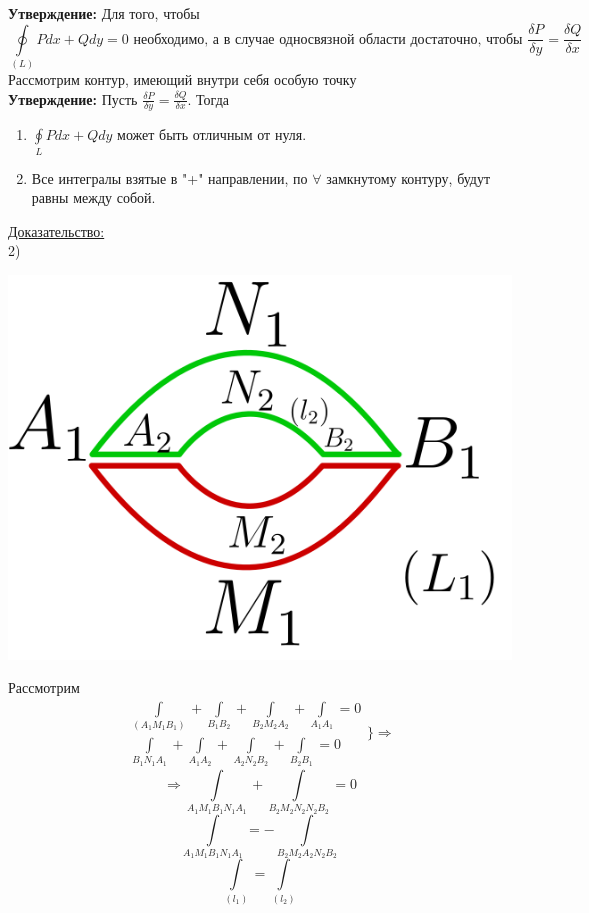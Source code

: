 \documentclass[12pt]{article}
\let\ORIincludegraphics\includegraphics
\renewcommand{\includegraphics}[2][]{\ORIincludegraphics[scale=0.65,#1]{#2}}
\let\oldint\int
\let\oldoint\oint
\renewcommand{\int}{\oldint\limits}
\renewcommand{\oint}{\oldoint\limits}
\begin{document}
  \par
  \textbf{Утверждение:} Для того, чтобы\\
  \[\oint_{(L)} Pdx+Qdy=0 \text{ необходимо, а в случае односвязной области достаточно, чтобы } \frac{\delta P}{\delta y}=\frac{\delta Q}{\delta x}\]
  Рассмотрим контур, имеющий внутри себя особую точку\\
  \textbf{Утверждение:} Пусть $\frac{\delta P}{\delta y}=\frac{\delta Q}{\delta x}$. Тогда
  \begin{enumerate}
    \item $\oint_{L}Pdx+Qdy$ может быть отличным от нуля.
    \item Все интегралы взятые в "+" направлении, по $\forall$ замкнутому контуру, будут равны между собой.
  \end{enumerate}
  \underline{Доказательство:}\\
  2)
  \begin{minipage}{0.45\textwidth}
    \includegraphics[scale=0.6]{8.8.4.png}
  \end{minipage}
  \hspace{1em}
  \begin{minipage}{0.55\textwidth}
    Рассмотрим \\
    \[\begin{matrix}
      \int_{(A_1M_1B_1)}+\int_{B_1B_2}+\int_{B_2M_2A_2}+\int_{A_1A_1} = 0\\
      \int_{B_1N_1A_1}+\int_{A_1A_2}+\int_{A_2N_2B_2}+\int_{B_2B_1} =0 
    \end{matrix} \Bigg\} \Rightarrow\] 
    \[\Rightarrow \int_{A_1M_1B_1N_1A_1} + \int_{B_2M_2N_2N_2B_2} =0 \]
    \[\int_{A_1M_1B_1N_1A_1}=-\int_{B_2M_2A_2N_2B_2}\]
    \[\int_{(l_1)}=\int_{(l_2)}\]
  \end{minipage}
\end{document}
